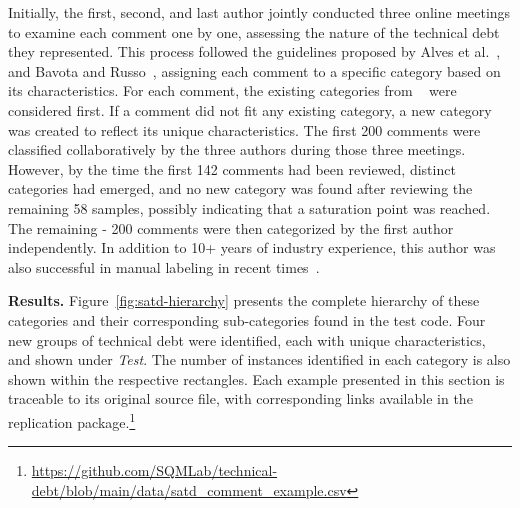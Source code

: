 Initially, the first, second, and last author jointly conducted three online meetings to examine each comment one by one, assessing the nature of the technical debt they represented. This process followed the guidelines proposed by Alves et al.~\cite{alves_towards_2014}, and Bavota and Russo~\cite{bavota_large-scale_2016}, assigning each comment to a specific category based on its characteristics. For each comment, the existing categories from ~\cite{alves_towards_2014,bavota_large-scale_2016} were considered first. If a comment did not fit any existing category, a new category was created to reflect its unique characteristics. The first 200 comments were classified collaboratively by the three authors during those three meetings. However, by the time the first 142 comments had been reviewed, \categoryCount{} distinct categories had emerged, and no new category was found after reviewing the remaining 58 samples, possibly indicating that a saturation point was reached.
The remaining \the\numexpr \totalSatdCount - 200 \relax{} comments were then categorized by the first author independently. In addition to 10+ years of industry experience, this author was also successful in manual labeling in recent times~\cite{islam2025historyfinder,opu2025understanding}.


\textbf{Results.} Figure~\ref{fig:satd-hierarchy} presents the complete hierarchy of these categories and their corresponding sub-categories found in the test code. Four new groups of technical debt were identified, each with unique characteristics, and shown under \textit{Test}.
The number of instances identified in each category is also shown within the respective rectangles. Each example presented in this section is traceable to its original source file, with corresponding links available in the replication package.\footnote{\url{https://github.com/SQMLab/technical-debt/blob/main/data/satd_comment_example.csv}}




